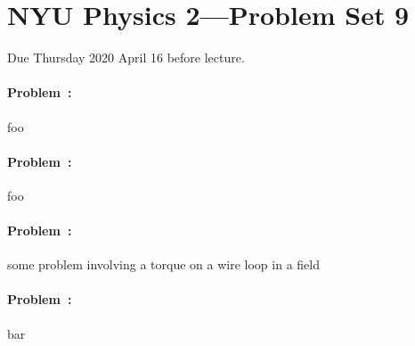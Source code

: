 \documentclass[12pt]{article}
\begin{document}
\section*{NYU Physics 2---Problem Set 9}

Due Thursday 2020 April 16 before lecture.

\paragraph{Problem~\theproblem:}%
foo

\paragraph{Problem~\theproblem:}%
foo

\paragraph{Problem~\theproblem:}%
some problem involving a torque on a wire loop in a field

\paragraph{Problem~\theproblem:}%
bar
\end{document}
